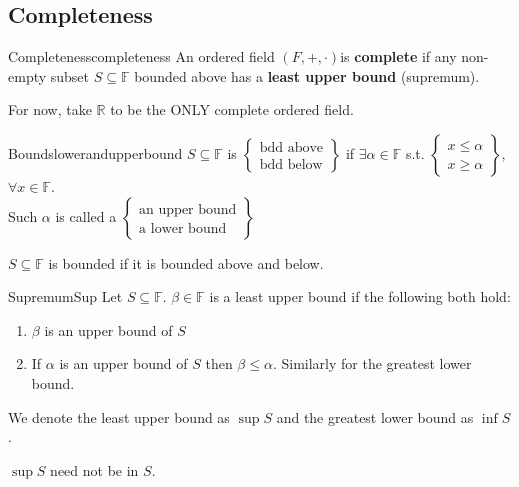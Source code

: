 \documentclass[11pt, letterpaper, openany]{book}
\begin{document}
\subsection{Completeness}
\begin{defn}{Completeness}{completeness}
An ordered field $(F,+,\cdot)$is \textbf{complete} if any non-empty subset $S\subseteq\mathbb{F}$ bounded above has a \textbf{least upper bound} (supremum).
\end{defn}
\begin{remark}
    For now, take $\mathbb{R}$ to be the ONLY complete ordered field.
\end{remark}
\begin{defn}{Bounds}{lowerandupperbound}
    $S\subseteq\mathbb{F}$ is $\left\{\begin{array}{c}
        \text{bdd above} \\
        \text{bdd below}
    \end{array}\right\}$ if $\exists\alpha\in\mathbb{F}$ s.t. $\left\{\begin{array}{c}
        x\leq{\alpha} \\
        x \geq \alpha 
    \end{array}\right\}$, $\forall{x}\in\mathbb{F}$. \\ 
    Such $\alpha$ is called a $\left\{\begin{array}{c}
        \text{an upper bound} \\
        \text{a lower bound}
    \end{array}\right\}$
\end{defn}
\begin{remark}
    $S\subseteq\mathbb{F}$ is bounded if it is bounded above and below. 
\end{remark}
\begin{defn}{Supremum}{Sup}
    Let $S\subseteq{\mathbb{F}}$. $\beta\in\mathbb{F}$ is a least upper bound if the following both hold: \begin{enumerate}
        \item $\beta$ is an upper bound of $S$
        \item If $\alpha$ is an upper bound of $S$ then $\beta\leq\alpha$. Similarly for the greatest lower bound. 
    \end{enumerate}
    We denote the least upper bound as $\sup{S}$ and the greatest lower bound as $\inf{S}$. 
\end{defn}
\begin{remark}
    $\sup{S}$ need not be in $S$. 
\end{remark}
\end{document}
